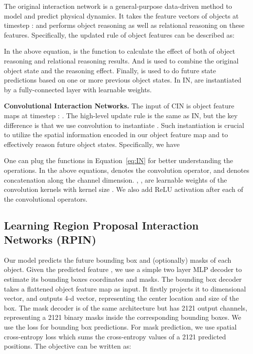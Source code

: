 \documentclass{article} \usepackage{iclr2021_conference,times}
\begin{document}
The original interaction network is a general-purpose data-driven method to model and predict physical dynamics. It takes the feature vectors of  objects at timestep :  and performs object reasoning  as well as relational reasoning  on these features. Specifically, the updated rule of object features can be described as:

In the above equation,  is the function to calculate the effect of both of object reasoning and relational reasoning results. And  is used to combine the original object state and the reasoning effect. Finally,  is used to do future state predictions based on one or more previous object states. In IN,  are instantiated by a fully-connected layer with learnable weights.

\textbf{Convolutional Interaction Networks.} 
The input of CIN is  object feature maps at timestep : . The high-level update rule is the same as IN, but the key difference is that we use convolution to instantiate . Such instantiation is crucial to utilize the spatial information encoded in our object feature map and to effectively reason future object states. Specifically, we have

\vspace{-0.39em}


One can plug the functions in Equation~\ref{eq:IN} for better understanding the operations. In the above equations,  denotes the convolution operator, and  denotes concatenation along the channel dimension. , ,  are learnable weights of the convolution kernels with kernel size . We also add ReLU activation after each of the convolutional operators.

\vspace{-0.5em}
\subsection{Learning Region Proposal Interaction Networks (RPIN)}
\vspace{-0.5em}
Our model predicts the future bounding box and (optionally) masks of each object. Given the predicted feature , we use a simple two layer MLP decoder to estimate its bounding boxes coordinates and masks. The bounding box decoder takes a flattened object feature map as input. It firstly projects it to  dimensional vector, and outputs 4-d vector, representing the center location and size of the box. The mask decoder is of the same architecture but has 2121 output channels, representing a 2121 binary masks inside the corresponding bounding boxes. We use the  loss for bounding box predictions. For mask prediction, we use spatial cross-entropy loss which sums the cross-entropy values of a 2121 predicted positions. The objective can be written as:
\vspace{-0.2em}
\end{document}
